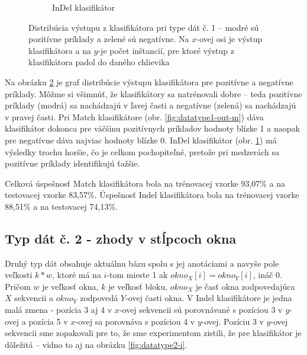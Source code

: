 \begin{figure}[htp]
\begin{subfigure}[t]{0.4\textwidth}
                \caption{InDel klasifikátor}
                \label{fig:datatype1-out-i}
        \end{subfigure}
        \caption[Distribúcia výstupu z klasifikátora pri type dát č. 1]{Distribúcia výstupu z klasifikátora pri type dát č. 1 -- modré sú pozitívne príklady a zelené sú negatívne. Na $x$-ovej osi je výstup klasifikátora a na $y$-je počet inštancií, pre ktoré výstup z klasifikátora padol do daného chlievika}
        \label{fig:datatype1-out}
\end{figure}

Na obrázku \ref{fig:datatype1-out} je graf distribúcie výstupu klasifikátora pre pozitívne a negatívne príklady.
Môžme si všimnúť, že klasifikátory sa natrénovali dobre -- teda pozitívne príklady (modrá) sa nachádzajú v ľavej časti a negatívne (zelená) sa nachádzajú v pravej časti.
Pri Match klasifikátore (obr. \ref{fig:datatype1-out-m}) dáva klasifikátor dokonca pre väčšinu pozitívnych príkladov hodnoty blízke 1 a naopak pre negatívne dáva najviac hodnoty blízke 0.
InDel klasifikátor (obr. \ref{fig:datatype1-out-i}) má výsledky trochu horšie, čo je celkom pochopiteľné, pretože pri medzerách sa pozitívne príklady identifikujú ťažšie.

Celková úspešnosť Match klasifikátora bola na trénovacej vzorke 93,07\% a na testovacej vzorke 83,57\%.
Úspešnosť Indel klasifikátora bola na trénovacej vzorke 88,51\% a na testovacej 74,13\%.

\subsection{Typ dát č. 2 - zhody v stĺpcoch okna}
\label{subsec:datatype2}

Druhý typ dát obsahuje aktuálnu bázu spolu s jej anotáciami a navyše pole veľkosti $k*w$,
 ktoré má na $i$-tom mieste 1 ak $okno_X[i] = okno_Y[i]$, ináč 0.
 Pričom $w$ je veľkosť okna, $k$ je veľkosť bloku, $okno_X$ je časť okna zodpovedajúca $X$ sekvencii a $okno_Y$ zodpovedá $Y$-ovej časti okna.
V Indel klasifikátore je jedna malá zmena - pozícia 3 aj 4 v $x$-ovej sekvencii sú porovnávané s pozíciou 3 v $y$-ovej a pozícia 5 v $x$-ovej sa porovnáva s pozíciou 4 v $y$-ovej.
Pozíciu 3 v $y$-ovej sekvencii sme zopakovali pre to, že sme experimentom zistili, že pre klasifikátor je dôležitá -- vidno to aj na obrázku \ref{fig:datatype2-i}.

